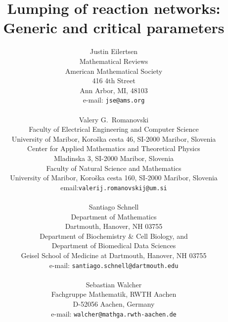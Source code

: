 \documentclass{article}
\begin{document}

\author{Justin Eilertsen\\
        Mathematical Reviews\\ American Mathematical Society\\
        416 4th Street\\Ann Arbor, MI, 48103\\
        e-mail: {\tt jse@ams.org}\\\\
        Valery G.\ Romanovski\\
        Faculty of Electrical Engineering and Computer Science \\ University of Maribor, 
        Koro\v ska cesta 46, SI-2000 Maribor, Slovenia\\
        Center for Applied Mathematics and Theoretical Physics \\
        Mladinska 3,  SI-2000 Maribor, Slovenia\\
        Faculty of Natural Science and Mathematics  \\
        University of Maribor, Koro\v ska cesta 160, SI-2000 Maribor, Slovenia\\
        email:{\tt valerij.romanovskij@um.si}    \\\\
        Santiago Schnell\\
        Department of Mathematics \\ 
        Dartmouth, Hanover, NH 03755\\
        Department of Biochemistry \& Cell Biology, and \\
        Department of Biomedical Data Sciences\\
        Geisel School of Medicine at Dartmouth, Hanover, NH 03755\\
        e-mail: {\tt santiago.schnell@dartmouth.edu}\\\\
        Sebastian Walcher\\
        Fachgruppe Mathematik, RWTH Aachen\\
        D-52056 Aachen, Germany\\
        e-mail: {\tt walcher@mathga.rwth-aachen.de}
        }

\title{Lumping of reaction networks: \\Generic and critical parameters}

\maketitle
\end{document}
